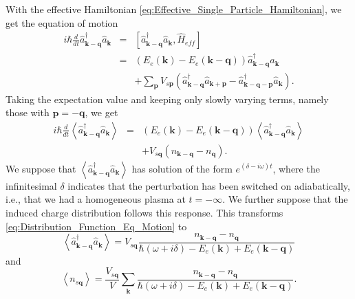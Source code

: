 With the effective Hamiltonian \ref{eq:Effective_Single_Particle_Hamiltonian},
we get the equation of motion \begin{eqnarray}
i\hbar\frac{d}{dt}\hat{a}_{\mathbf{k}-\mathbf{q}}^{\dagger}\hat{a}_{\mathbf{k}} & = & \left[\hat{a}_{\mathbf{k}-\mathbf{q}}^{\dagger}\hat{a}_{\mathbf{k}},\hat{H}_{eff}\right]\nonumber \\
 & = & \left(E_{e}(\mathbf{k})-E_{e}(\mathbf{k}-\mathbf{q})\right)\hat{a}_{\mathbf{k}-\mathbf{q}}^{\dagger}\hat{a}_{\mathbf{k}}\nonumber \\
 &  & +\sum_{\mathbf{p}}V_{s\mathbf{p}}\left(\hat{a}_{\mathbf{k}-\mathbf{q}}^{\dagger}\hat{a}_{\mathbf{k}+\mathbf{p}}-\hat{a}_{\mathbf{k}-\mathbf{q}-\mathbf{p}}^{\dagger}\hat{a}_{\mathbf{k}}\right).\end{eqnarray}
Taking the expectation value and keeping only slowly varying terms,
namely those with $\mathbf{p}=-\mathbf{q}$, we get \begin{eqnarray}
i\hbar\frac{d}{dt}\left\langle \hat{a}_{\mathbf{k}-\mathbf{q}}^{\dagger}\hat{a}_{\mathbf{k}}\right\rangle  & = & \left(E_{e}(\mathbf{k})-E_{e}(\mathbf{k}-\mathbf{q})\right)\left\langle \hat{a}_{\mathbf{k}-\mathbf{q}}^{\dagger}\hat{a}_{\mathbf{k}}\right\rangle \nonumber \\
 &  & +V_{s\mathbf{q}}\left(n_{\mathbf{k}-\mathbf{q}}-n_{\mathbf{q}}\right).\label{eq:Distribution_Function_Eq_Motion}\end{eqnarray}
We suppose that $\left\langle \hat{a}_{\mathbf{k}-\mathbf{q}}^{\dagger}\hat{a}_{\mathbf{k}}\right\rangle $
has solution of the form $e^{\left(\delta-i\omega\right)t}$, where
the infinitesimal $\delta$ indicates that the perturbation has been
switched on adiabatically, i.e., that we had a homogeneous plasma
at $t=-\infty$. We further suppose that the induced charge distribution
follows this response. This transforms \ref{eq:Distribution_Function_Eq_Motion}
to \begin{equation}
\left\langle \hat{a}_{\mathbf{k}-\mathbf{q}}^{\dagger}\hat{a}_{\mathbf{k}}\right\rangle =V_{s\mathbf{q}}\frac{n_{\mathbf{k}-\mathbf{q}}-n_{\mathbf{q}}}{\hbar\left(\omega+i\delta\right)-E_{e}(\mathbf{k})+E_{e}(\mathbf{k}-\mathbf{q})}\end{equation}
and \begin{equation}
\left\langle n_{s\mathbf{q}}\right\rangle =\frac{V_{s\mathbf{q}}}{V}\sum_{\mathbf{k}}\frac{n_{\mathbf{k}-\mathbf{q}}-n_{\mathbf{q}}}{\hbar\left(\omega+i\delta\right)-E_{e}(\mathbf{k})+E_{e}(\mathbf{k}-\mathbf{q})}.\label{eq:Distribution_Expectation_Value}\end{equation}
